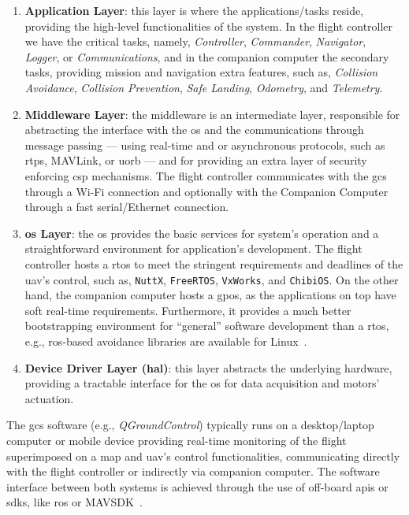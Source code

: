 \begin{enumerate}
\item \textbf{Application Layer}: this layer is where the applications/tasks
  reside, providing the high-level functionalities of the system. In the flight
  controller we have the critical tasks, namely,
  \emph{Controller}, \emph{Commander}, \emph{Navigator}, \emph{Logger},
  or \emph{Communications}, and in the companion computer the secondary tasks,
  providing mission and navigation extra features, such as, \emph{Collision
    Avoidance}, \emph{Collision Prevention}, \emph{Safe Landing},
  \emph{Odometry}, and \emph{Telemetry}.
%
\item \textbf{Middleware Layer}: the middleware is an intermediate layer,
  responsible for abstracting the interface with the \gls{os} and the
  communications through message passing --- using real-time and or asynchronous
  protocols, such as \gls{rtps}, MAVLink, or \gls{uorb} --- and for providing
  an extra layer of security enforcing \gls{csp} mechanisms. The flight
  controller communicates with the \gls{gcs} through a Wi-Fi connection and
  optionally with the Companion Computer through a fast serial/Ethernet
  connection.
%
\item \textbf{\gls{os} Layer}: the \gls{os} provides the basic services for
  system's operation and a straightforward environment for application's
  development. The flight controller hosts a \gls{rtos} to meet the stringent
  requirements and deadlines of the \gls{uav}'s control, such as,
  \lstinline{NuttX}, \lstinline{FreeRTOS}, \lstinline{VxWorks}, and \lstinline{ChibiOS}. On
  the other hand, the companion computer hosts a \gls{gpos}, as the applications
  on top have soft real-time requirements. Furthermore, it provides a much
  better bootstrapping environment for ``general'' software development than a
  \gls{rtos}, e.g., \gls{ros}-based avoidance libraries are available for Linux~\cite{px4-sysArch}.
%
\item \textbf{Device Driver Layer (\gls{hal})}: this layer abstracts the
  underlying hardware, providing a tractable interface for the \gls{os} for data
  acquisition and motors' actuation.
\end{enumerate}

The \gls{gcs} software (e.g., \emph{QGroundControl}) typically runs on a desktop/laptop computer or mobile
device providing real-time monitoring of the flight superimposed on a map and
\gls{uav}'s control functionalities, communicating directly with the flight
controller or indirectly via companion computer. The
software interface between both systems is achieved through the use of off-board
\glspl{api} or \glspl{sdk}, like \gls{ros} or MAVSDK~\cite{px4-sysArch}. 

